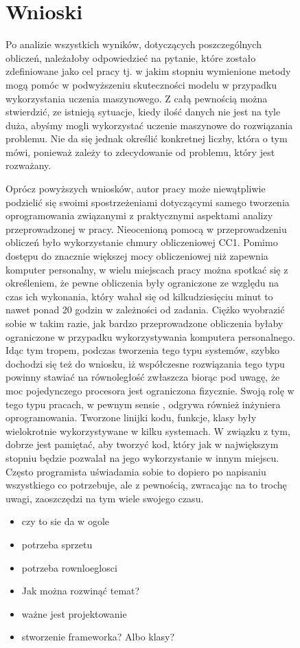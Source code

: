 \begin{figure}
\begin{minipage}{\linewidth}
\section{Wnioski}\label{conclusion}
Po analizie wszystkich wyników, dotyczących poszczególnych obliczeń, należałoby odpowiedzieć na pytanie, które zostało zdefiniowane jako cel pracy tj. w jakim stopniu wymienione metody mogą pomóc w podwyższeniu skuteczności modelu w przypadku wykorzystania uczenia maszynowego. Z całą pewnością można stwierdzić, ze istnieją  sytuacje, kiedy ilość danych nie jest na tyle duża, abyśmy mogli wykorzystać uczenie maszynowe do rozwiązania problemu. Nie da się jednak określić konkretnej liczby, która o tym mówi, ponieważ zależy to zdecydowanie od problemu, który jest rozważany.

Oprócz powyższych wniosków, autor pracy może niewątpliwie podzielić się swoimi spostrzeżeniami dotyczącymi samego tworzenia oprogramowania związanymi z praktycznymi aspektami analizy przeprowadzonej w pracy. Nieocenioną pomocą w przeprowadzeniu obliczeń było wykorzystanie chmury obliczeniowej CC1. Pomimo dostępu do znacznie większej mocy obliczeniowej niż zapewnia komputer personalny, w wielu miejscach pracy można spotkać się z określeniem, że pewne obliczenia były ograniczone ze względu na czas ich wykonania, który wahał się od kilkudziesięciu minut to nawet ponad 20 godzin w zależności od zadania. Ciężko wyobrazić sobie w takim razie, jak bardzo przeprowadzone obliczenia byłaby ograniczone w przypadku wykorzystywania komputera personalnego. Idąc tym tropem, podczas tworzenia tego typu systemów, szybko dochodzi się też do wniosku, iż współczesne rozwiązania tego typu powinny stawiać na równoległość zwłaszcza biorąc pod uwagę, że moc pojedynczego procesora jest ograniczona fizycznie. Swoją rolę w tego typu pracach, w pewnym sensie , odgrywa również inżyniera oprogramowania. Tworzone linijki kodu, funkcje, klasy były wielokrotnie wykorzystywane w kilku systemach. W związku z tym, dobrze jest pamiętać, aby tworzyć kod, który jak w największym stopniu będzie pozwalał na jego wykorzystanie w innym miejscu. Często programista uświadamia sobie to dopiero po napisaniu wszystkiego co potrzebuje, ale z pewnością, zwracając na to trochę uwagi, zaoszczędzi na tym wiele swojego czasu.

\begin{itemize}
\item czy to sie da w ogole
\item potrzeba sprzetu
\item potrzeba rownloeglosci
\item Jak można rozwinąć temat?
\item ważne jest projektowanie
\item stworzenie frameworka? Albo klasy?
\end{itemize}
\end{minipage}
\end{figure}